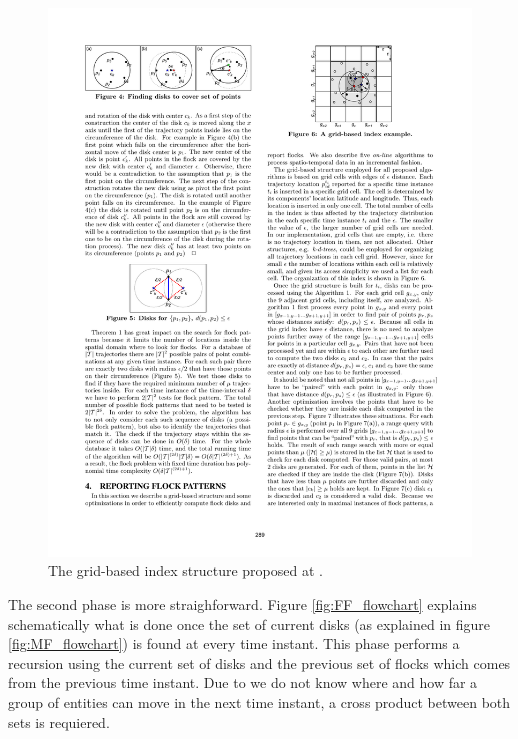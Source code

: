 \documentclass[journal,onecolumn]{IEEEtran}
\begin{document}
\begin{figure}
    \centering
    \includegraphics[clip,trim=13cm 21.75cm 4.1cm 1.85cm]{figures/grid}
    \caption{The grid-based index structure proposed at \cite{vieira_2009}.}\label{fig:grid}
\end{figure}

The second phase is more straighforward.  Figure \ref{fig:FF_flowchart} explains schematically what is done once the set of current disks (as explained in figure \ref{fig:MF_flowchart}) is found at every time instant.  This phase performs a recursion using the current set of disks and the previous set of flocks which comes from the  previous time instant.  Due to we do not know where and how far a group of entities can move in the next time instant, a cross product between both sets is requiered.  
\end{document}
